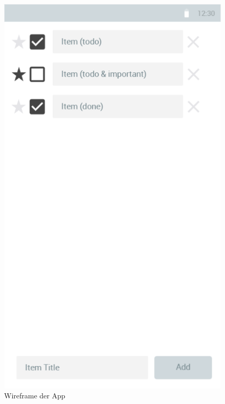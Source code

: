 \begin{figure}[h!]
	\includegraphics[scale=0.5]{img/fig/4-3-1_wireframe.png}
	\centering
	\caption{Wireframe der App}
	\label{fig:wireframe}
\end{figure}


